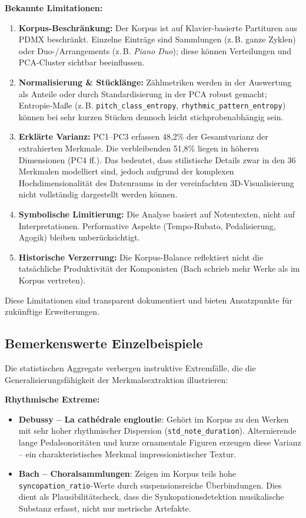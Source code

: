 \documentclass[12pt,a4paper]{article}
\theoremstyle{definition}
\begin{document}
\textbf{Bekannte Limitationen:}
\begin{enumerate}
    \item \textbf{Korpus-Beschränkung:} Der Korpus ist auf Klavier-basierte Partituren aus PDMX beschränkt. Einzelne Einträge sind Sammlungen (z.\,B. ganze Zyklen) oder Duo-/Arrangements (z.\,B. \textit{Piano Duo}); diese können Verteilungen und PCA-Cluster sichtbar beeinflussen.
    \item \textbf{Normalisierung \& Stücklänge:} Zählmetriken werden in der Auswertung als Anteile oder durch Standardisierung in der PCA robust gemacht; Entropie-Maße (z.\,B. \texttt{pitch\_class\_entropy}, \texttt{rhythmic\_pattern\_entropy}) können bei sehr kurzen Stücken dennoch leicht stichprobenabhängig sein.
    \item \textbf{Erklärte Varianz:} PC1--PC3 erfassen 48,2\% der Gesamtvarianz der extrahierten Merkmale. Die verbleibenden 51,8\% liegen in höheren Dimensionen (PC4 ff.). Das bedeutet, dass stilistische Details zwar in den 36 Merkmalen modelliert sind, jedoch aufgrund der komplexen Hochdimensionalität des Datenraums in der vereinfachten 3D-Visualisierung nicht vollständig dargestellt werden können.
    \item \textbf{Symbolische Limitierung:} Die Analyse basiert auf Notentexten, nicht auf Interpretationen. Performative Aspekte (Tempo-Rubato, Pedalisierung, Agogik) bleiben unberücksichtigt.
    \item \textbf{Historische Verzerrung:} Die Korpus-Balance reflektiert nicht die tatsächliche Produktivität der Komponisten (Bach schrieb mehr Werke als im Korpus vertreten).
\end{enumerate}

Diese Limitationen sind transparent dokumentiert und bieten Ansatzpunkte für zukünftige Erweiterungen.

\subsection{Bemerkenswerte Einzelbeispiele}
Die statistischen Aggregate verbergen instruktive Extremfälle, die die Generalisierungsfähigkeit der Merkmalsextraktion illustrieren:

\textbf{Rhythmische Extreme:}
\begin{itemize}
    \item \textbf{Debussy -- La cathédrale engloutie}: Gehört im Korpus zu den Werken mit sehr hoher rhythmischer Dispersion (\texttt{std\_note\_duration}). Alternierende lange Pedalsonoritäten und kurze ornamentale Figuren erzeugen diese Varianz -- ein charakteristisches Merkmal impressionistischer Textur.
    
    \item \textbf{Bach -- Choralsammlungen}: Zeigen im Korpus teils hohe \texttt{syncopation\_ratio}-Werte durch suspensionsreiche Überbindungen. Dies dient als Plausibilitätscheck, dass die Synkopationsdetektion musikalische Substanz erfasst, nicht nur metrische Artefakte.
\end{itemize}
\end{document}

